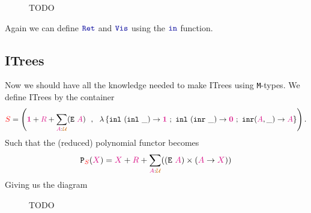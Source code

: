 \documentclass[twoside,11pt,openright]{report}
\theoremstyle{plain} %
\theoremstyle{definition}
\theoremstyle{remark}
\newcommand*{\type}[1]{\textcolor{magenta!90!black}{#1}}
\newcommand*{\container}[1]{\textcolor{red}{#1}}
\newcommand*{\universe}[1]{\textcolor{orange!80!black}{#1}}
\newcommand*{\unit}{\type{\textbf{1}}}
\newcommand*{\empt}{\type{\textbf{0}}}
\newcommand*{\function}[1]{\textcolor{blue!60!black}{\ensuremath{\mathtt{#1}}}}
\newcommand*{\typeformer}[1]{\ensuremath{\mathtt{#1}}}
\newcommand*{\functor}[1]{\ensuremath{\mathbf{\mathtt{#1}}}}
\begin{document}
\begin{figure}[h]
  \centering
  \caption{TODO}
\end{figure}
\noindent Again we can define \(\function{Ret}\) and \(\function{Vis}\) using the \(\function{in}\) function.

\subsection{ITrees}
Now we should have all the knowledge needed to make ITrees using \texttt{M}-types. We define ITrees by the container
\begin{equation}
  \container{S} = \left( \unit+\type{R}+\sum_{\type{A}:\universe{\mathcal{U}}} (\typeformer{E}~\type{A}) ~~,~~ \lambda\left\{ \texttt{inl}~(\texttt{inl}~\_) \rightarrow \unit ~;~ \texttt{inl}~(\texttt{inr}~\_) \rightarrow \empt ~;~ \texttt{inr} (\type{A},\_)  \rightarrow \type{A} \right\} \right).
\end{equation}
Such that the (reduced) polynomial functor becomes
\begin{equation}
  \functor{P}_{\container{S}}(\type{X}) = \type{X} + \type{R} + \sum_{\type{A} : \universe{\mathcal{U}}} ((\typeformer{E}~\type{A}) \times (\type{A} \rightarrow \type{X}))
\end{equation}
Giving us the diagram
\begin{figure}[h]
  \centering
  \caption{TODO}
\end{figure}
\end{document}
